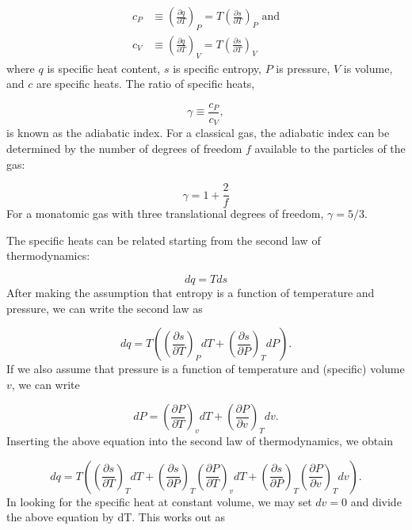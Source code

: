 \documentclass[12pt]{article}
\newcommand{\pderiv}[2]{\frac{\partial #1}{\partial #2}}
\newcommand{\bigparenthesis}[1]{\left(#1\right)}
\begin{document}
\begin{align}
    c_P &\equiv \bigparenthesis{\pderiv{q}{T}}_{P} = T\bigparenthesis{\pderiv{s}{T}}_{P}\text{ and} \\
    c_V &\equiv \bigparenthesis{\pderiv{q}{T}}_V = T\bigparenthesis{\pderiv{s}{T}}_V
\end{align}
%
where $q$ is specific heat content, $s$ is specific entropy, $P$ is pressure, $V$ is volume, and $c$ are specific heats. The ratio of specific heats,

\begin{equation}
    \gamma \equiv \frac{c_P}{c_V},
\end{equation}
%
is known as the adiabatic index. For a classical gas, the adiabatic index can be determined by the number of degrees of freedom $f$ available to the particles of the gas:

\begin{equation}
    \gamma = 1 + \frac{2}{f}
\end{equation}
%
For a monatomic gas with three translational degrees of freedom, $\gamma = 5/3$.

The specific heats can be related starting from the second law of thermodynamics:

\begin{equation}
    dq = T ds
\end{equation}
%
After making the assumption that entropy is a function of temperature and pressure, we can write the second law as

\begin{equation}
    dq = T \left(\bigparenthesis{\pderiv{s}{T}}_P dT + \bigparenthesis{\pderiv{s}{P}}_T dP \right).
\end{equation}
%
If we also assume that pressure is a function of temperature and (specific) volume $v$, we can write

\begin{equation}
    dP = \bigparenthesis{\pderiv{P}{T}}_v dT + \bigparenthesis{\pderiv{P}{v}}_T dv.
\end{equation}
%
Inserting the above equation into the second law of thermodynamics, we obtain

\begin{equation}
    dq = T \left(\bigparenthesis{\pderiv{s}{T}}_T dT + \bigparenthesis{\pderiv{s}{P}}_T \bigparenthesis{\pderiv{P}{T}}_v dT + \bigparenthesis{\pderiv{s}{P}}_T \bigparenthesis{\pderiv{P}{v}}_T dv \right).
\end{equation}
%
In looking for the specific heat at constant volume, we may set $dv = 0$ and divide the above equation by dT. This works out as
\end{document}
